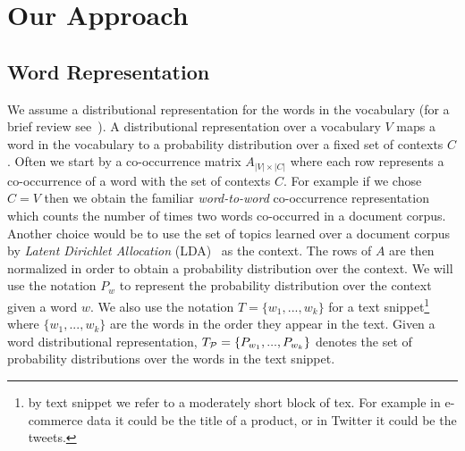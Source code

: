 \documentclass{article} %
\begin{document}
















\section{Our Approach}
\label{sec:our-approach}

\subsection{Word Representation}
\label{sec:word-representation}

We assume a distributional representation for the words in the vocabulary (for a brief review
see~\cite{Turian10wordrepresentations}). A distributional representation over a vocabulary $V$ maps a word in the vocabulary to a 
probability distribution over a fixed set of contexts $C$. Often we start by a co-occurrence matrix $A_{|V|\times|C|}$ where each row represents a co-occurrence of a word with the set of contexts
$C$. For example if we chose $C=V$ then we obtain the familiar {\sl word-to-word} co-occurrence representation which counts the number
of times two words co-occurred in a document corpus. Another choice would be to use the set of topics learned over a document
corpus by {\sl Latent Dirichlet Allocation} (LDA)~\cite{Blei:2003:LDA:944919.944937} as the context. The rows of $A$
are then normalized in order to obtain a probability distribution over the context. We will use the notation $P_w$ to represent
the probability distribution over the context  given a word $w$. We also use the notation $T=\{w_1,...,w_k\}$ for a text
snippet\footnote{by text snippet we refer to a moderately short block of tex. For example in e-commerce data it could be the
title of a product, or in Twitter it could be the tweets.} where
$\{w_1,...,w_k\}$ are the words in the order they appear in the
text. Given a word distributional representation, $T_{{\mathcal P}}=\{P_{w_1},...,P_{w_k}\}$ denotes the set of probability distributions over the words
in the text snippet.
\end{document}
